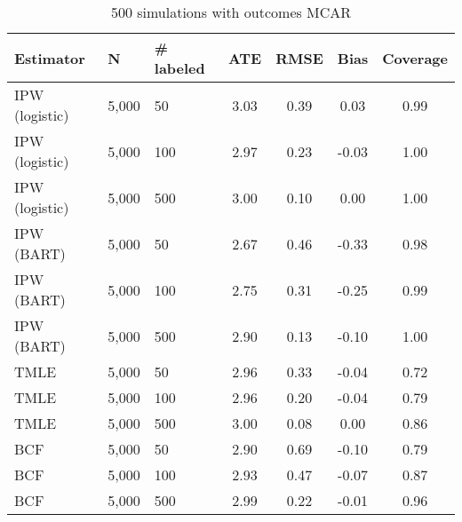 \begin{table}[ht]
\centering
\begingroup\small
\begin{tabular}{lllcccc}
  \hline
Estimator & N & \# labeled & ATE & RMSE & Bias & Coverage \\ 
  \hline
  IPW (logistic) & 5,000 &  50 & 3.03 & 0.39 & 0.03 & 0.99 \\ 
  IPW (logistic) & 5,000 & 100 & 2.97 & 0.23 & -0.03 & 1.00 \\ 
IPW (logistic) & 5,000 & 500 & 3.00 & 0.10 & 0.00 & 1.00 \\ 
  IPW (BART) & 5,000 &  50 & 2.67 & 0.46 & -0.33 & 0.98 \\ 
  IPW (BART) & 5,000 & 100 & 2.75 & 0.31 & -0.25 & 0.99 \\ 
  IPW (BART) & 5,000 & 500 & 2.90 & 0.13 & -0.10 & 1.00 \\ 
  TMLE & 5,000 &  50 & 2.96 & 0.33 & -0.04 & 0.72 \\ 
  TMLE & 5,000 & 100 & 2.96 & 0.20 & -0.04 & 0.79 \\ 
  TMLE & 5,000 & 500 & 3.00 & 0.08 & 0.00 & 0.86 \\ 
  BCF & 5,000 &  50 & 2.90 & 0.69 & -0.10 & 0.79 \\ 
  BCF & 5,000 & 100 & 2.93 & 0.47 & -0.07 & 0.87 \\ 
  BCF & 5,000 & 500 & 2.99 & 0.22 & -0.01 & 0.96 \\ 
   \hline
\end{tabular}
\endgroup
\caption{500 simulations with outcomes MCAR} 
\end{table}
